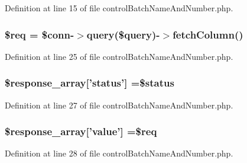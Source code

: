 Definition at line 15 of file control\-Batch\-Name\-And\-Number.\-php.

\hypertarget{control_batch_name_and_number_8php_a63a7a283ea5dee8af1e2d5a3435bf370}{
\subsubsection[{\$req}]{\setlength{\rightskip}{0pt plus 5cm}\$req = \$conn-\/$>$query(\$query)-\/$>$fetch\-Column()}}\label{control_batch_name_and_number_8php_a63a7a283ea5dee8af1e2d5a3435bf370}


Definition at line 25 of file control\-Batch\-Name\-And\-Number.\-php.

\hypertarget{control_batch_name_and_number_8php_acd0903a7a32e8397aefd0ce8b7dbd1ab}{
\subsubsection[{\$response\-\_\-array}]{\setlength{\rightskip}{0pt plus 5cm}\$response\-\_\-array\mbox{[}'status'\mbox{]} =\$status}}\label{control_batch_name_and_number_8php_acd0903a7a32e8397aefd0ce8b7dbd1ab}


Definition at line 27 of file control\-Batch\-Name\-And\-Number.\-php.

\hypertarget{control_batch_name_and_number_8php_abbcbb7142adc1824bb5531445d2de0f0}{
\subsubsection[{\$response\-\_\-array}]{\setlength{\rightskip}{0pt plus 5cm}\$response\-\_\-array\mbox{[}'value'\mbox{]} =\$req}}\label{control_batch_name_and_number_8php_abbcbb7142adc1824bb5531445d2de0f0}


Definition at line 28 of file control\-Batch\-Name\-And\-Number.\-php.


